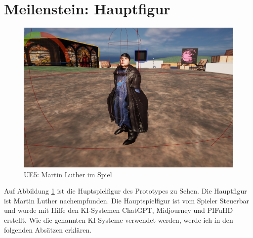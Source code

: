 \section {Meilenstein: Hauptfigur}
\begin{figure}[!h]
	\centering
	\includegraphics[width=14cm]{BilderFuerBA/MartinLutherImSpiel.png}
	\caption{UE5: Martin Luther im Spiel}
	\label{MartinLutherImSpiel}
\end{figure}
Auf Abbildung \ref{MartinLutherImSpiel} ist die Huptspielfigur des Prototypes zu Sehen. Die Hauptfigur ist Martin Luther nachempfunden. Die Hauptspielfigur ist vom Spieler Steuerbar und wurde mit Hilfe den KI-Systemen ChatGPT, Midjourney und PIFuHD erstellt. Wie die genannten KI-Systeme verwendet werden, werde ich in den folgenden Absätzen erklären.

